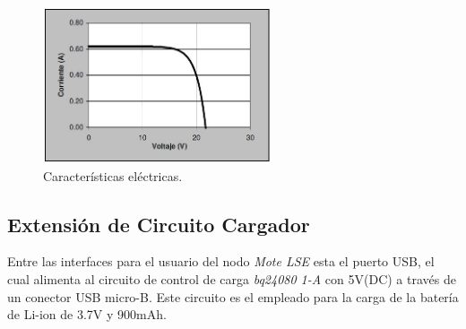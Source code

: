 {%


\begin{figure}[h!]
	\centering
    \includegraphics[width=0.6\textwidth]{./Figures/curva.JPG}
    	\caption{Características eléctricas.}
	\label{fig:curva}
\end{figure}

\clearpage
\subsection{Extensión de Circuito Cargador}
\label{subsec:extensión}
Entre las interfaces para el usuario del nodo \textit{Mote LSE} esta el puerto USB, el cual alimenta al circuito de control de carga \textit{bq24080 1-A} con 5V(DC) a través de un conector USB micro-B. Este circuito es el empleado para la carga de la batería de Li-ion de 3.7V y 900mAh.

}
